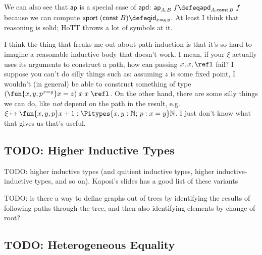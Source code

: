 \documentclass[11pt]{article} %
\theoremstyle{definition}
\theoremstyle{remark}
\begin{document}
We can also see that $\mathsf{ap}$ is a special case of $\mathsf{apd}$:
  $\mathsf{ap}_{A,B}\;f \defeq \mathsf{apd}_{A,\mathsf{const}\,B}\;f$
  because we can compute $\mathsf{xport}\;(\mathsf{const}\;B) \defeq \mathsf{id}_{x=_{\!B}y}$.
At least I think that reasoning is solid; HoTT throws a lot of symbols at it.

I think the thing that freaks me out about path induction is that it's so hard to imagine a reasonable inductive body that doesn't work.
I mean, if your $\xi$ actually uses its arguments to construct a path, how can passing $x, x, \refl$ fail?
I suppose you can't do silly things such as: assuming $z$ is some fixed point, I wouldn't (in general) be able to construct something of type $(\fun{x,y,p^{x=y}}x=z)\;x\;x\;\refl$.
On the other hand, there are some silly things we can do, like \emph{not} depend on the path in the result, e.g.\ $\xi \mapsto \fun{x,y,p} x + 1 : \Pitypes{x,y : \mathbb N;\, p : x=y}\mathbb N$.
I just don't know what that gives us that's useful.










\subsection{TODO: Higher Inductive Types}\label{subsec:HIT}

TODO: higher inductive types (and quitient inductive types, higher inductive-inductive types, and so on).
Kaposi's slides has a good list of these variants

TODO:
is there a way to define graphs out of trees by identifying the results of following paths through the tree, and then also identifying elements by change of root?


\subsection{TODO: Heterogeneous Equality}
\end{document}
